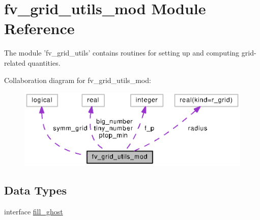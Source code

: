 \section{fv\-\_\-grid\-\_\-utils\-\_\-mod Module Reference}
\label{classfv__grid__utils__mod}


The module 'fv\-\_\-grid\-\_\-utils' contains routines for setting up and computing grid-\/related quantities.  




Collaboration diagram for fv\-\_\-grid\-\_\-utils\-\_\-mod\-:
\nopagebreak
\begin{figure}[H]
\begin{center}
\leavevmode
\includegraphics[width=350pt]{classfv__grid__utils__mod__coll__graph}
\end{center}
\end{figure}
\subsection*{Data Types}
\begin{DoxyCompactItemize}
\item 
interface \hyperlink{interfacefv__grid__utils__mod_1_1fill__ghost}{fill\-\_\-ghost}
\end{DoxyCompactItemize}

